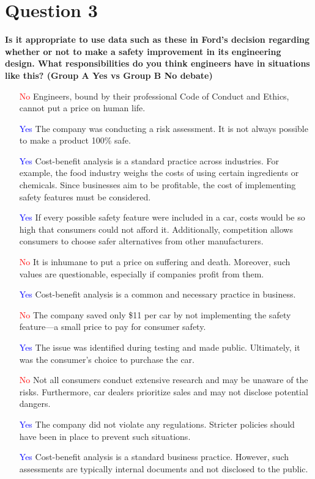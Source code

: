 \documentclass[12pt]{article}
\begin{document}
\section{Question 3}
\textbf{Is it appropriate to use data such as these in Ford’s decision regarding whether or not to make a safety improvement in its engineering design. What responsibilities do you think engineers have in situations like this?  (Group A Yes vs Group B No debate)}

\begin{itemize}
    \item [\textcolor{red}{No}] Engineers, bound by their professional Code of Conduct and Ethics, cannot put a price on human life.
    \item [\textcolor{blue}{Yes}] The company was conducting a risk assessment. It is not always possible to make a product 100\% safe.
    \item [\textcolor{blue}{Yes}] Cost-benefit analysis is a standard practice across industries. For example, the food industry weighs the costs of using certain ingredients or chemicals. Since businesses aim to be profitable, the cost of implementing safety features must be considered.
    \item [\textcolor{blue}{Yes}] If every possible safety feature were included in a car, costs would be so high that consumers could not afford it. Additionally, competition allows consumers to choose safer alternatives from other manufacturers.
    \item [\textcolor{red}{No}] It is inhumane to put a price on suffering and death. Moreover, such values are questionable, especially if companies profit from them.
    \item [\textcolor{blue}{Yes}] Cost-benefit analysis is a common and necessary practice in business.
    \item [\textcolor{red}{No}] The company saved only \$11 per car by not implementing the safety feature—a small price to pay for consumer safety.
    \item [\textcolor{blue}{Yes}] The issue was identified during testing and made public. Ultimately, it was the consumer's choice to purchase the car.
    \item [\textcolor{red}{No}] Not all consumers conduct extensive research and may be unaware of the risks. Furthermore, car dealers prioritize sales and may not disclose potential dangers.
    \item [\textcolor{blue}{Yes}] The company did not violate any regulations. Stricter policies should have been in place to prevent such situations.
    \item [\textcolor{blue}{Yes}] Cost-benefit analysis is a standard business practice. However, such assessments are typically internal documents and not disclosed to the public.
\end{itemize}
\end{document}
